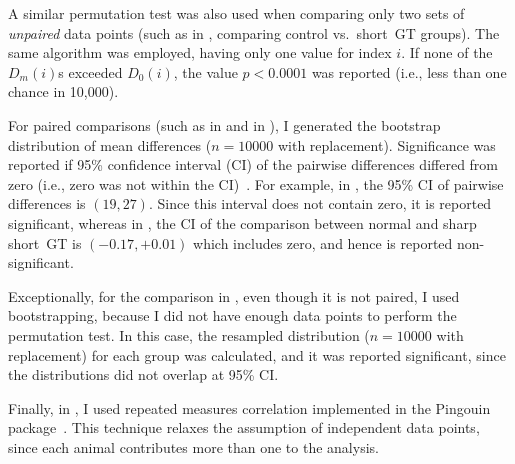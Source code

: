 \par
A similar permutation test was also used when comparing only two sets of \textit{unpaired} data points (such as in , comparing control vs.\ short~GT groups).
The same algorithm was employed, having only one value for index $i$.
If none of the $D_m(i)$s exceeded $D_0(i)$, the value $p<0.0001$ was reported (i.e., less than one chance in 10,000).
\par
For paired comparisons (such as in  and in ), I generated the bootstrap distribution of mean differences ($n=10000$ with replacement).
Significance was reported if 95\% confidence interval (CI) of the pairwise differences differed from zero (i.e., zero was not within the CI)~\cite{Efron1994}.
For example, in , the 95\% CI of pairwise differences is $(19, 27)$.
Since this interval does not contain zero, it is reported significant, whereas in , the CI of the comparison between normal and sharp short~GT is $(-0.17, +0.01)$ which includes zero, and hence is reported non-significant.
\par
Exceptionally, for the comparison in , even though it is not paired, I used bootstrapping, because I did not have enough data points to perform the permutation test.
In this case, the resampled distribution ($n=10000$ with replacement) for each group was calculated, and it was reported significant, since the distributions did not overlap at 95\% CI.
\par
Finally, in , I used repeated measures correlation implemented in the Pingouin package~\cite{PingouinToolbox}.
This technique relaxes the assumption of independent data points, since each animal contributes more than one to the analysis.
